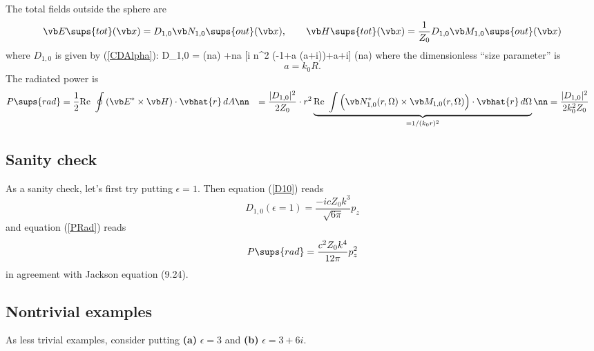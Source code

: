 \documentclass[letterpaper]{article}
\begin{document}
The total fields outside the sphere are
$$ \vb E\sups{tot}(\vb x)
   =
   D_{1,0} \vb N_{1,0}\sups{out}(\vb x),
   \qquad
   \vb H\sups{tot}(\vb x)
   =
   \frac{1}{Z_0}D_{1,0} \vb M_{1,0}\sups{out}(\vb x)
$$
where $D_{1,0}$ is given by (\ref{CDAlpha}):
{
D_{1,0} =
         {  
           \sin (na)
           +na [i n^2 (-1+a (a+i))+a+i] \cos (na)
         }
}
where the dimensionless ``size parameter'' is
$$ a=k_0 R.$$
The radiated power is 
\begin{align}
P\sups{rad}
&= \frac{1}{2} \text{Re }\oint
   \left(\vb E^* \times \vb H\right) \cdot \vbhat{r}\,
   dA
\nn
&=\frac{|D_{1,0}|^2}{2Z_0}
  \cdot r^2
  \underbrace{
  \text{Re }
  \int \Big(\vb N_{1,0}^*(r,\Omega) \times \vb M_{1,0}(r,\Omega)\Big)
        \cdot \vbhat{r} \, d\Omega
             }_{=1/(k_0r)^2}
\nn
&=\frac{|D_{1,0}|^2}{2k_0^2 Z_0}
\label{PRad}
\end{align}

\subsection*{Sanity check}

As a sanity check, let's first try putting $\epsilon=1$.
Then equation (\ref{D10}) reads
$$ D_{1,0}(\epsilon=1) = \frac{-icZ_0 k^3}{\sqrt{6\pi}} p_z$$
and equation (\ref{PRad}) reads
$$ P\sups{rad}=\frac{c^2 Z_0 k^4}{12\pi}p_z^2$$
in agreement with Jackson equation (9.24).

\subsection*{Nontrivial examples}

As less trivial examples, consider putting 
\textbf{(a)} $\epsilon=3$
and 
\textbf{(b)} $\epsilon=3+6i.$
\end{document}
